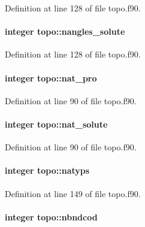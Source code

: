 Definition at line 128 of file topo.\-f90.

\hypertarget{classtopo_a9095694ab9db269f2ee2508062eee9bd}{
\paragraph[{nangles\-\_\-solute}]{\setlength{\rightskip}{0pt plus 5cm}integer topo\-::nangles\-\_\-solute}}\label{classtopo_a9095694ab9db269f2ee2508062eee9bd}


Definition at line 128 of file topo.\-f90.

\hypertarget{classtopo_a9c36bc3f022fb8a4dbb82c24369a4dc9}{
\paragraph[{nat\-\_\-pro}]{\setlength{\rightskip}{0pt plus 5cm}integer topo\-::nat\-\_\-pro}}\label{classtopo_a9c36bc3f022fb8a4dbb82c24369a4dc9}


Definition at line 90 of file topo.\-f90.

\hypertarget{classtopo_aa2c11d8a835cd358961ef16ed23e444b}{
\paragraph[{nat\-\_\-solute}]{\setlength{\rightskip}{0pt plus 5cm}integer topo\-::nat\-\_\-solute}}\label{classtopo_aa2c11d8a835cd358961ef16ed23e444b}


Definition at line 90 of file topo.\-f90.

\hypertarget{classtopo_aa2c6ab1859a6c008f5b356dbaa530d07}{
\paragraph[{natyps}]{\setlength{\rightskip}{0pt plus 5cm}integer topo\-::natyps}}\label{classtopo_aa2c6ab1859a6c008f5b356dbaa530d07}


Definition at line 149 of file topo.\-f90.

\hypertarget{classtopo_a87c426cfe207ece52a6f31615499f98e}{
\paragraph[{nbndcod}]{\setlength{\rightskip}{0pt plus 5cm}integer topo\-::nbndcod}}\label{classtopo_a87c426cfe207ece52a6f31615499f98e}


